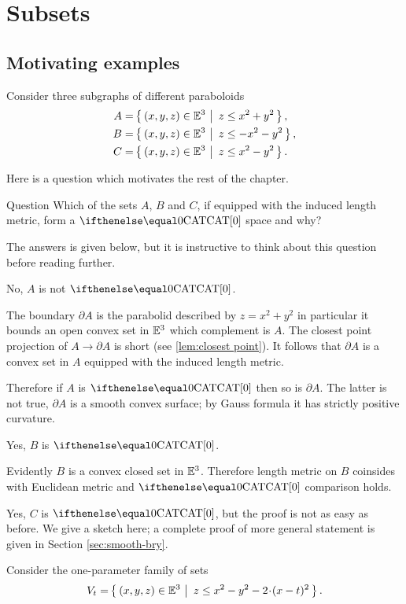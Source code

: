 \chapter{Subsets}

\section{Motivating examples}

Consider three subgraphs of different paraboloids
\begin{align*}
A&=\set{(x,y,z)\in\EE^3}{z\le x^2+y^2},
\\
B&=\set{(x,y,z)\in\EE^3}{z\le -x^2-y^2},
\\
C&=\set{(x,y,z)\in\EE^3}{z\le x^2-y^2}.
\end{align*}

Here is a question which motivates the rest of the chapter.


\begin{thm}{Question}
Which of the sets $A$, $B$ and $C$, if equipped with the induced length metric, form a $\CAT{0}$ space and why?
\end{thm}

The answers is given below, but it is instructive to think about this question before reading further.

 No, $A$ is not $\CAT0$.
 
The boundary $\partial A$ is the parabolid described by  $z=x^2+y^2$ in particular it bounds an open convex set in $\mathbb{E}^3$ which complement is $A$.
The closest point projection of $A\to\partial A$ is short (see \ref{lem:closest point}).
It follows that $\partial A$ is a convex set in $A$ equipped with the induced length metric.

Therefore if $A$ is $\CAT0$ then so is $\partial A$.
The latter is not true, $\partial A$ is a smooth convex surface; by Gauss formula it has strictly positive curvature.


 Yes, $B$ is $\CAT0$. 

Evidently $B$ is a convex closed set in $\mathbb{E}^3$. 
Therefore length metric on $B$ coinsides with Euclidean metric
and $\CAT0$ comparison holds.

 Yes, $C$ is $\CAT0$, 
but the proof is not as easy as before.
We give a sketch here;
a complete proof of more general statement is given in Section \ref{sec:smooth-bry}.

Consider the one-parameter family of sets 
\[V_t=\set{(x,y,z)\in\EE^3}{z\le x^2-y^2 -2\cdot (x-t)^2}.\]


